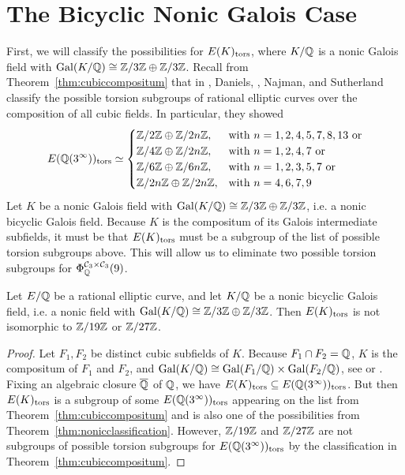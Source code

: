 \section{The Bicyclic Nonic Galois Case\label{sec:nonicbi}}

First, we will classify the possibilities for $E(K)_{\text{tors}}$, where $K/\mathbb{Q}$ is a nonic Galois field with $\operatorname{Gal}(K/\mathbb{Q}) \cong \mathbb{Z}/3\mathbb{Z} \oplus \mathbb{Z}/3\mathbb{Z}$. Recall from Theorem~\ref{thm:cubiccompositum} that in \cite{danielslozrobnajmansutherland18}, Daniels, \lozrob{}, Najman, and Sutherland classify the possible torsion subgroups of rational elliptic curves over the composition of all cubic fields. In particular, they showed
	\[
	E(\mathbb{Q}(3^\infty))_{\text{tors}} \simeq
	\begin{cases}
	\mathbb{Z}/2\mathbb{Z} \oplus \mathbb{Z}/2n\mathbb{Z}, & \text{with } n= 1,2,4,5,7,8,13 \text{ or} \\
	\mathbb{Z}/4\mathbb{Z} \oplus \mathbb{Z}/2n\mathbb{Z}, & \text{with } n= 1,2,4,7 \text{ or} \\
	\mathbb{Z}/6\mathbb{Z} \oplus \mathbb{Z}/6n\mathbb{Z}, & \text{with } n= 1,2,3,5,7 \text{ or} \\
	\mathbb{Z}/2n\mathbb{Z} \oplus \mathbb{Z}/2n\mathbb{Z}, & \text{with } n=4,6,7,9
	\end{cases}
	\]
Let $K$ be a nonic Galois field with $\operatorname{Gal}(K/\mathbb{Q}) \cong \mathbb{Z}/3\mathbb{Z} \oplus \mathbb{Z}/3\mathbb{Z}$, i.e. a nonic bicyclic Galois field. Because $K$ is the compositum of its Galois intermediate subfields, it must be that $E(K)_{\text{tors}}$ must be a subgroup of the list of possible torsion subgroups above. This will allow us to eliminate two possible torsion subgroups for $\Phi_{\mathbb{Q}}^{\mathcal{C}_3 \times \mathcal{C}_3}(9)$. 


\begin{lem} \label{biexclude}
Let $E/\mathbb{Q}$ be a rational elliptic curve, and let $K/\mathbb{Q}$ be a nonic bicyclic Galois field, i.e. a nonic field with $\operatorname{Gal}(K/\mathbb{Q}) \cong \mathbb{Z}/3\mathbb{Z} \oplus \mathbb{Z}/3\mathbb{Z}$. Then $E(K)_{\text{tors}}$ is not isomorphic to $\mathbb{Z}/19\mathbb{Z}$ or $\mathbb{Z}/27\mathbb{Z}$. 
\end{lem}

\begin{proof}
Let $F_1,F_2$ be distinct cubic subfields of $K$. Because $F_1 \cap F_2= \mathbb{Q}$, $K$ is the compositum of $F_1$ and $F_2$, and $\operatorname{Gal}(K/\mathbb{Q}) \cong \operatorname{Gal}(F_1/\mathbb{Q}) \times \operatorname{Gal}(F_2/\mathbb{Q})$, see \cite[Ch.~14,Prop.~21]{dummitfoote} or \cite[VI,\S1,Thm.~1.14]{lang93}. Fixing an algebraic closure $\overline{\mathbb{Q}}$ of $\mathbb{Q}$, we have $E(K)_{\text{tors}} \subseteq E(\mathbb{Q}(3^\infty))_{\text{tors}}$. But then $E(K)_{\text{tors}}$ is a subgroup of some $E(\mathbb{Q}(3^\infty))_{\text{tors}}$ appearing on the list from Theorem~\ref{thm:cubiccompositum} and is also one of the possibilities from Theorem~\ref{thm:nonicclassification}. However, $\mathbb{Z}/19\mathbb{Z}$ and $\mathbb{Z}/27\mathbb{Z}$ are not subgroups of possible torsion subgroups for $E(\mathbb{Q}(3^\infty))_{\text{tors}}$ by the classification in Theorem~\ref{thm:cubiccompositum}. 
\end{proof}


